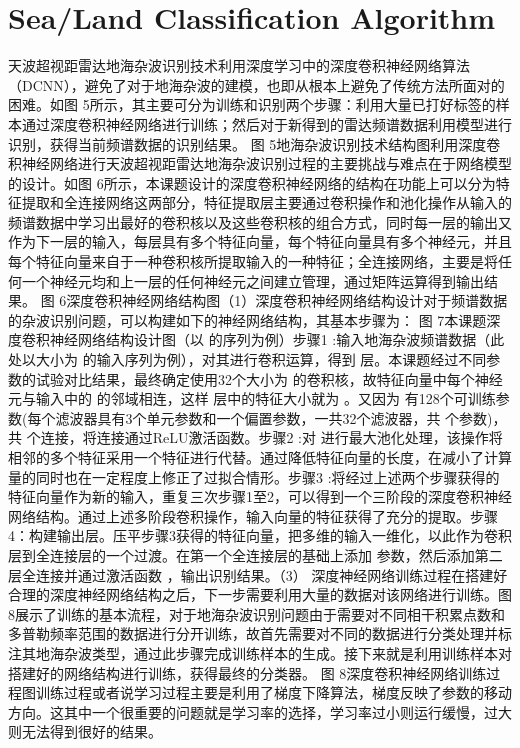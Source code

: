 \section{Sea/Land Classification Algorithm}

天波超视距雷达地海杂波识别技术利用深度学习中的深度卷积神经网络算法（DCNN），避免了对于地海杂波的建模，也即从根本上避免了传统方法所面对的困难。如图 5所示，其主要可分为训练和识别两个步骤：利用大量已打好标签的样本通过深度卷积神经网络进行训练；然后对于新得到的雷达频谱数据利用模型进行识别，获得当前频谱数据的识别结果。 图 5地海杂波识别技术结构图利用深度卷积神经网络进行天波超视距雷达地海杂波识别过程的主要挑战与难点在于网络模型的设计。如图 6所示，本课题设计的深度卷积神经网络的结构在功能上可以分为特征提取和全连接网络这两部分，特征提取层主要通过卷积操作和池化操作从输入的频谱数据中学习出最好的卷积核以及这些卷积核的组合方式，同时每一层的输出又作为下一层的输入，每层具有多个特征向量，每个特征向量具有多个神经元，并且每个特征向量来自于一种卷积核所提取输入的一种特征；全连接网络，主要是将任何一个神经元均和上一层的任何神经元之间建立管理，通过矩阵运算得到输出结果。 图 6深度卷积神经网络结构图（1）深度卷积神经网络结构设计对于频谱数据的杂波识别问题，可以构建如下的神经网络结构，其基本步骤为： 图 7本课题深度卷积神经网络结构设计图（以 的序列为例）步骤1 :输入地海杂波频谱数据（此处以大小为 的输入序列为例），对其进行卷积运算，得到 层。本课题经过不同参数的试验对比结果，最终确定使用32个大小为 的卷积核，故特征向量中每个神经元与输入中的 的邻域相连，这样 层中的特征大小就为 。又因为 有128个可训练参数(每个滤波器具有3个单元参数和一个偏置参数，一共32个滤波器，共 个参数)，共 个连接，将连接通过ReLU激活函数。步骤2 :对 进行最大池化处理，该操作将相邻的多个特征采用一个特征进行代替。通过降低特征向量的长度，在减小了计算量的同时也在一定程度上修正了过拟合情形。步骤3 :将经过上述两个步骤获得的特征向量作为新的输入，重复三次步骤1至2，可以得到一个三阶段的深度卷积神经网络结构。通过上述多阶段卷积操作，输入向量的特征获得了充分的提取。步骤4：构建输出层。压平步骤3获得的特征向量，把多维的输入一维化，以此作为卷积层到全连接层的一个过渡。在第一个全连接层的基础上添加 参数，然后添加第二层全连接并通过激活函数 ，输出识别结果。（3）	深度神经网络训练过程在搭建好合理的深度神经网络结构之后，下一步需要利用大量的数据对该网络进行训练。图 8展示了训练的基本流程，对于地海杂波识别问题由于需要对不同相干积累点数和多普勒频率范围的数据进行分开训练，故首先需要对不同的数据进行分类处理并标注其地海杂波类型，通过此步骤完成训练样本的生成。接下来就是利用训练样本对搭建好的网络结构进行训练，获得最终的分类器。 图 8深度卷积神经网络训练过程图训练过程或者说学习过程主要是利用了梯度下降算法，梯度反映了参数的移动方向。这其中一个很重要的问题就是学习率的选择，学习率过小则运行缓慢，过大则无法得到很好的结果。


